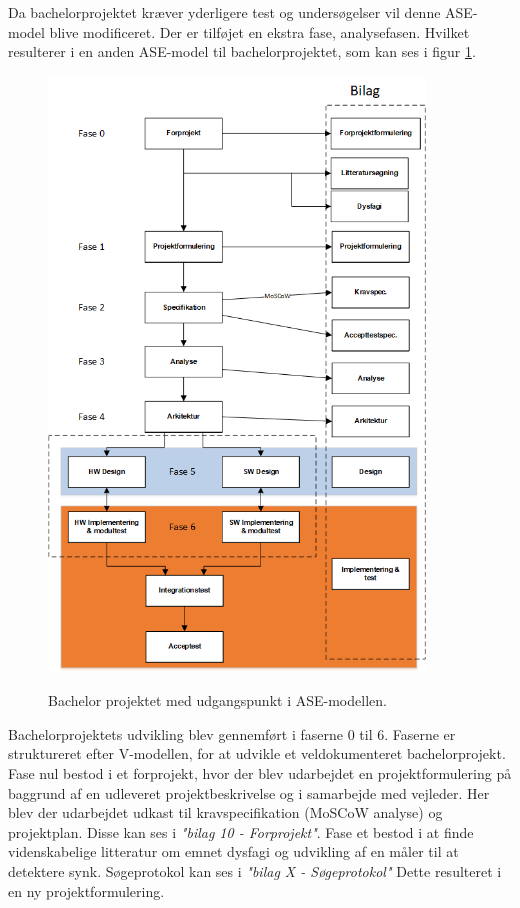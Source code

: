 Da bachelorprojektet kræver yderligere test og undersøgelser vil denne ASE-model blive modificeret. Der er tilføjet en ekstra fase, analysefasen. Hvilket resulterer i en anden ASE-model til bachelorprojektet, som kan ses i figur \ref{procesVoresASE}.


\begin{figure}[H] 
\centering
{\includegraphics[width=10cm]
{Figure/procesVoresASE}}
\caption{Bachelor projektet med udgangspunkt i ASE-modellen.}
\label{procesVoresASE}
\end{figure}

Bachelorprojektets udvikling blev gennemført i faserne 0 til 6. Faserne er struktureret efter V-modellen\cite{IngeniorhojskolenAarhusUniversiteta}, for at udvikle et veldokumenteret bachelorprojekt. Fase nul bestod i et forprojekt, hvor der blev udarbejdet en projektformulering på baggrund af en udleveret projektbeskrivelse og i samarbejde med vejleder. Her blev der udarbejdet udkast til kravspecifikation (MoSCoW analyse) og projektplan. Disse kan ses i \textit{"bilag 10 - Forprojekt"}. Fase et bestod i at finde videnskabelige litteratur om emnet dysfagi og udvikling af en måler til at detektere synk. Søgeprotokol kan ses i \textit{"bilag X - Søgeprotokol"} Dette resulteret i en ny projektformulering.

